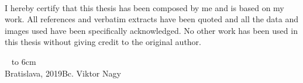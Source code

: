 \documentclass[12pt, a4paper, oneside]{book}
\newcommand\mfauthor{Bc. Viktor Nagy}
\newcommand\mfplacedate{Bratislava, 2019}
\begin{document}
\begin{figure}[H]
\begin{center}
\label{img:zadanie}
\end{center}
\end{figure}


\noindent
\begin{minipage}{0.25\textwidth}~\end{minipage}
\begin{minipage}{0.75\textwidth}
I hereby certify that this thesis has been composed by me and is based on my work.
All references and verbatim extracts have been quoted and all the data and images used have been specifically acknowledged.
No other work has been used in this thesis without giving credit to the original author.
\newline \newline
\end{minipage}
\vfill
~ \hfill {\hbox to 6cm{\dotfill}} \\
\mfplacedate \hfill \mfauthor
\vfill\eject
\end{document}
